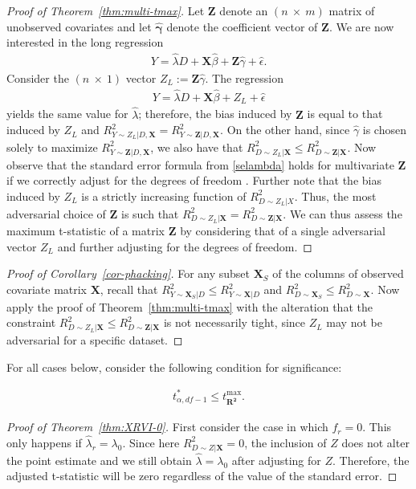 \documentclass[sts]{imsart}
\theoremstyle{plain}
\theoremstyle{definition}
\newcommand{\df}{df}
\newcommand{\Rd}{R^2_{D\sim Z | \mathbf{X}}}
\newcommand{\Rdlz}{R^2_{D\sim Z_L | \mathbf{X}}}
\newcommand{\Rdmv}{R^2_{D\sim \mathbf{Z} | \mathbf{X}}}
\newcommand{\tstar}{t^*_{\alpha, \df-1}}
\newcommand{\Ryx}{R^2_{Y \sim \mathbf{X}|D}}
\newcommand{\Rdx}{R^2_{D \sim \mathbf{X}}}
\begin{document}
\begin{appendix}
\begin{proof}[Proof of Theorem~\ref{thm:multi-tmax}]
Let $\mathbf{Z}$ denote an $(n~\times~m)$ matrix of  unobserved covariates and let $\boldsymbol{\hat{\gamma}}$ denote the coefficient vector of $\mathbf{Z}$. We are now interested in the long regression
\begin{align} 
    Y = \hat{\lambda}D + \mathbf{X}\hat{\beta} + \mathbf{Z}\hat{\gamma} + \hat{\epsilon}. \label{mv-regmodel}
\end{align}
Consider the $(n~\times~1)$ vector $Z_L := \mathbf{Z}\hat{\gamma}$. The regression 
\begin{align} 
    Y = \hat{\lambda}D + \mathbf{X}\hat{\beta} + Z_L + \hat{\epsilon} \label{zstar-regmodel}
\end{align}
yields the same value for $\hat{\lambda}$; therefore, the bias induced by $\mathbf{Z}$ is equal to that induced by $Z_L$  and $R^2_{Y \sim Z_L | D, \mathbf{X}} = R^2_{Y \sim \mathbf{Z} | D,\mathbf{X}}$. On the other hand, since $\hat{\gamma}$ is chosen solely to maximize $R^2_{Y \sim \mathbf{Z} | D,\mathbf{X}}$, we also have that $R^2_{D \sim Z_L | \mathbf{X}} \leq R^2_{D \sim \mathbf{Z} | \mathbf{X}}$. Now observe that the standard error formula from \eqref{selambda} holds for multivariate $\mathbf{Z}$ if we correctly adjust for the degrees of freedom \citep{cinelli_making_2020}. Further note that the bias induced by $Z_L$ is a strictly increasing function of $R^2_{D \sim Z_L | X}$. Thus, the most adversarial choice of $\mathbf{Z}$  is such that $R^2_{D \sim Z_L | \mathbf{X}} = R^2_{D \sim \mathbf{Z} | \mathbf{X}}$. We can thus assess the maximum t-statistic of a matrix $\mathbf{Z}$ by considering that of a single adversarial vector $Z_L$ and further adjusting for the degrees of freedom.
\end{proof}

\begin{proof}[Proof of Corollary~\ref{cor-phacking}] For any subset $\mathbf{X}_{S}$ of the columns of observed covariate matrix $\mathbf{X}$, recall that $R^2_{Y\sim\mathbf{X}_{S}|D} \leq \Ryx$ and $R^2_{D\sim\mathbf{X}_{S}} \leq \Rdx$. Now apply the proof of Theorem~\ref{thm:multi-tmax} with the alteration that the constraint $\Rdlz \leq \Rdmv$ is not necessarily tight, since $Z_L$ may not be adversarial for a specific dataset.
\end{proof}

For all cases below, consider the following condition for significance: 

\begin{align}
        \tstar \leq t^{\max}_{\boldsymbol{R^2}}. \label{maxineq}
\end{align}
\begin{proof}[Proof of Theorem~\ref{thm:XRVI-0}]
    First consider the case in which $f_{r} = 0$. This only happens if $\hat{\lambda}_r = \lambda_0$. Since here $\Rd=0$, the inclusion of $Z$ does not alter the point estimate and we still obtain $\hat{\lambda} = \lambda_0$ after adjusting for $Z$. Therefore, the adjusted t-statistic will be zero regardless of the value of the standard error. 
    

\end{proof}
\end{appendix}
\end{document}
